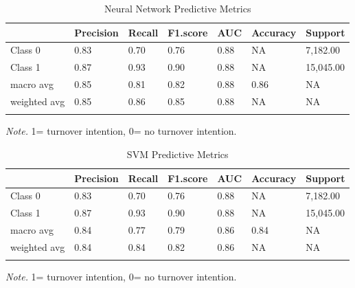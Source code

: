 \documentclass[
  man]{apa7}
\begin{document}
\begin{table}[tbp]

\begin{center}
\begin{threeparttable}

\caption{\label{tab:nn100k}Neural Network Predictive Metrics}

\begin{tabular}{lllllll}
\toprule
 & \multicolumn{1}{c}{Precision} & \multicolumn{1}{c}{Recall} & \multicolumn{1}{c}{F1.score} & \multicolumn{1}{c}{AUC} & \multicolumn{1}{c}{Accuracy} & \multicolumn{1}{c}{Support}\\
\midrule
Class 0 & 0.83 & 0.70 & 0.76 & 0.88 & NA & 7,182.00\\
Class 1 & 0.87 & 0.93 & 0.90 & 0.88 & NA & 15,045.00\\
macro avg & 0.85 & 0.81 & 0.82 & 0.88 & 0.86 & NA\\
weighted avg & 0.85 & 0.86 & 0.85 & 0.88 & NA & NA\\
\bottomrule
\addlinespace
\end{tabular}

\begin{tablenotes}[para]
\normalsize{\textit{Note.} 1= turnover intention, 0= no turnover intention.}
\end{tablenotes}

\end{threeparttable}
\end{center}

\end{table}

\begin{table}[tbp]

\begin{center}
\begin{threeparttable}

\caption{\label{tab:svm100k}SVM Predictive Metrics}

\begin{tabular}{lllllll}
\toprule
 & \multicolumn{1}{c}{Precision} & \multicolumn{1}{c}{Recall} & \multicolumn{1}{c}{F1.score} & \multicolumn{1}{c}{AUC} & \multicolumn{1}{c}{Accuracy} & \multicolumn{1}{c}{Support}\\
\midrule
Class 0 & 0.83 & 0.70 & 0.76 & 0.88 & NA & 7,182.00\\
Class 1 & 0.87 & 0.93 & 0.90 & 0.88 & NA & 15,045.00\\
macro avg & 0.84 & 0.77 & 0.79 & 0.86 & 0.84 & NA\\
weighted avg & 0.84 & 0.84 & 0.82 & 0.86 & NA & NA\\
\bottomrule
\addlinespace
\end{tabular}

\begin{tablenotes}[para]
\normalsize{\textit{Note.} 1= turnover intention, 0= no turnover intention.}
\end{tablenotes}

\end{threeparttable}
\end{center}

\end{table}
\end{document}
